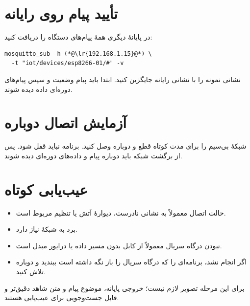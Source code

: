 \section{تأیید پیام روی رایانه}
در پایانهٔ دیگری همهٔ پیام‌های دستگاه را دریافت کنید:

\begin{LTR}
\begin{lstlisting}
mosquitto_sub -h (*@\lr{192.168.1.15}@*) \
  -t "iot/devices/esp8266-01/#" -v
\end{lstlisting}
\end{LTR}

نشانی نمونه را با نشانی رایانه جایگزین کنید. ابتدا باید پیام وضعیت و سپس پیام‌های دوره‌ای داده دیده شوند.

\section{آزمایش اتصال دوباره}
شبکهٔ بی‌سیم را برای مدت کوتاه قطع و دوباره وصل کنید. برنامه نباید قفل شود. پس از برگشت شبکه باید دوباره پیام
\lr{MQTT connected.}
و داده‌های دوره‌ای دیده شوند.

\section{عیب‌یابی کوتاه}
\begin{itemize}
  \item حالت اتصال
  معمولاً به نشانی نادرست، دیوارهٔ آتش یا تنظیم
  مربوط است.
  \item برد
  به شبکهٔ
  نیاز دارد.
  \item نبودن درگاه سریال معمولاً از کابل بدون مسیر داده یا درایور مبدل
  \lr{USB}
  است.
  \item اگر
  انجام نشد، برنامه‌ای را که درگاه سریال را باز نگه داشته است ببندید و دوباره تلاش کنید.
\end{itemize}

برای این مرحله تصویر لازم نیست؛ خروجی پایانه، موضوع پیام و متن
شاهد دقیق‌تر و قابل جست‌وجویی برای عیب‌یابی هستند.
